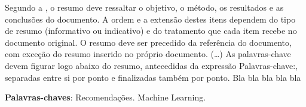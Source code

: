 \documentclass[
	12pt,				%
    oneside,			%
	a4paper,			%
	english,			%
	french,				%
	spanish,			%
	brazil,				%
	]{abntex2}
\begin{document}
\frenchspacing 


\imprimircapa

\imprimirfolhaderosto*






\begin{resumo} %
 Segundo a , o resumo deve ressaltar o
 objetivo, o método, os resultados e as conclusões do documento. A ordem e a extensão
 destes itens dependem do tipo de resumo (informativo ou indicativo) e do
 tratamento que cada item recebe no documento original. O resumo deve ser
 precedido da referência do documento, com exceção do resumo inserido no
 próprio documento. (\ldots) As palavras-chave devem figurar logo abaixo do
 resumo, antecedidas da expressão Palavras-chave:, separadas entre si por
 ponto e finalizadas também por ponto. Bla bla bla bla bla \cite{fulano} %

 \vspace{\onelineskip}
    
 \noindent
 \textbf{Palavras-chaves}: Recomendações. Machine Learning. 
\end{resumo} %
\end{document}
